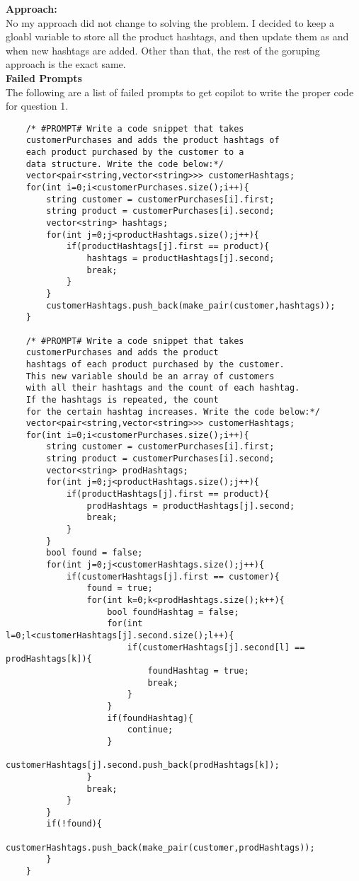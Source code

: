 \documentclass[12pt]{article}
\begin{document}
\textbf{Approach:}\\
No my approach did not change to solving the problem. I decided to keep a gloabl variable to store all the product hashtags, and then update them as and when new hashtags are added. Other than that, the rest of the goruping approach is the exact same.\\


\textbf{Failed Prompts}\\
The following are a list of failed prompts to get copilot to write the proper code for question 1.\\
\begin{verbatim}
    /* #PROMPT# Write a code snippet that takes 
    customerPurchases and adds the product hashtags of 
    each product purchased by the customer to a 
    data structure. Write the code below:*/
    vector<pair<string,vector<string>>> customerHashtags;
    for(int i=0;i<customerPurchases.size();i++){
        string customer = customerPurchases[i].first;
        string product = customerPurchases[i].second;
        vector<string> hashtags;
        for(int j=0;j<productHashtags.size();j++){
            if(productHashtags[j].first == product){
                hashtags = productHashtags[j].second;
                break;
            }
        }
        customerHashtags.push_back(make_pair(customer,hashtags));
    }
    
    /* #PROMPT# Write a code snippet that takes 
    customerPurchases and adds the product 
    hashtags of each product purchased by the customer. 
    This new variable should be an array of customers 
    with all their hashtags and the count of each hashtag. 
    If the hashtags is repeated, the count 
    for the certain hashtag increases. Write the code below:*/
    vector<pair<string,vector<string>>> customerHashtags;
    for(int i=0;i<customerPurchases.size();i++){
        string customer = customerPurchases[i].first;
        string product = customerPurchases[i].second;
        vector<string> prodHashtags;
        for(int j=0;j<productHashtags.size();j++){
            if(productHashtags[j].first == product){
                prodHashtags = productHashtags[j].second;
                break;
            }
        }
        bool found = false;
        for(int j=0;j<customerHashtags.size();j++){
            if(customerHashtags[j].first == customer){
                found = true;
                for(int k=0;k<prodHashtags.size();k++){
                    bool foundHashtag = false;
                    for(int l=0;l<customerHashtags[j].second.size();l++){
                        if(customerHashtags[j].second[l] == prodHashtags[k]){
                            foundHashtag = true;
                            break;
                        }
                    }
                    if(foundHashtag){
                        continue;
                    }
                    customerHashtags[j].second.push_back(prodHashtags[k]);
                }
                break;
            }
        }
        if(!found){
            customerHashtags.push_back(make_pair(customer,prodHashtags));
        }
    }


\end{verbatim}
\end{document}

